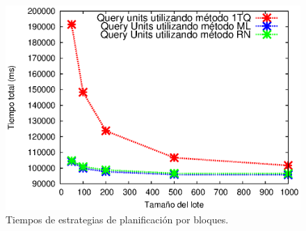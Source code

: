 \begin{figure}[tp]
\centering
\includegraphics[scale=.75]{images/gov2_bmw.eps}
\caption{Tiempos de estrategias de planificación por bloques.}
\label{fig:gov2_bmw}
\end{figure}